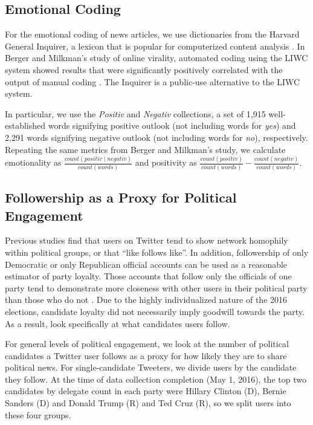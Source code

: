 \documentclass[letterpaper]{article}
\begin{document}
\subsection{Emotional Coding}
For the emotional coding of news articles, we use dictionaries from the Harvard General Inquirer, a lexicon that is popular for computerized content analysis \cite{stone1963computer}. In Berger and Milkman's study of online virality, automated coding using the LIWC system showed results that were significantly positively correlated with the output of manual coding \cite{berger2012makes}. The Inquirer is a public-use alternative to the LIWC system. 

In particular, we use the \emph{Positiv} and \emph{Negativ} collections, a set of 1,915 well-established words signifying positive outlook (not including words for \emph{yes}) and 2,291 words signifying negative outlook (not including words for \emph{no}), respectively. Repeating the same metrics from Berger and Milkman's study, we calculate emotionality as $\frac{count(positiv \mid negativ)}{count(words)}$ and positivity as $\frac{count(positiv)}{count(words)} - \frac{count(negativ)}{count(words)}$.


 \subsection{Followership as a Proxy for Political Engagement}
Previous studies find that users on Twitter tend to show network homophily within political groups, or that ``like follows like''. In addition, followership of only Democratic or only Republican official accounts can be used as a reasonable estimator of party loyalty. Those accounts that follow only the officials of one party tend to demonstrate more closeness with other users in their political party than those who do not \cite{colleoni2014echo}. Due to the highly individualized nature of the 2016 elections, candidate loyalty did not necessarily imply goodwill towards the party. As a result, look specifically at what candidates users follow. 

For general levels of political engagement, we look at the number of political candidates a Twitter user follows as a proxy for how likely they are to share political news. For single-candidate Tweeters, we divide users by the candidate they follow. At the time of data collection completion (May 1, 2016), the top two candidates by delegate count in each party were Hillary Clinton (D), Bernie Sanders (D) and Donald Trump (R) and Ted Cruz (R), so we split users into these four groups. 
\end{document}
